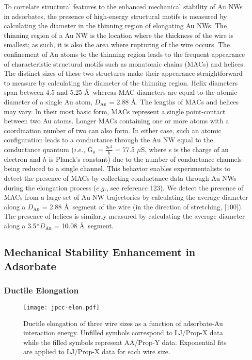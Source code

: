 \documentclass[10pt]{report}  %
\begin{document}
To correlate structural features to the enhanced mechanical stability of Au NWs in adsorbates, the presence of high-energy structural motifs is measured by calculating the diameter in the thinning region of elongating Au NWs.  The thinning region of a Au NW is the location where the thickness of the wire is smallest; as such, it is also the area where rupturing of the wire occurs.  The confinement of Au atoms to the thinning region leads to the frequent appearance of characteristic structural motifs such as monatomic chains (MACs) and helices.  The distinct sizes of these two structures make their appearance straightforward to measure by calculating the diameter of the thinning region.  Helix diameters span between 4.5 and 5.25 \AA\ whereas MAC diameters are equal to the atomic diameter of a single Au atom, $D_\mathrm{Au}$ = 2.88 \AA.  The lengths of MACs and helices may vary.  In their most basic form, MACs represent a single point-contact between two Au atoms.  Longer MACs containing one or more atoms with a coordination number of two can also form.  In either case, such an atomic configuration leads to a conductance through the Au NW equal to the conductance quantum ($i.e.$, G$_o$ =  $\frac{2e^{2}}{h}$ = 77.5 $\mu$S, where $e$ is the charge of an electron and $h$ is Planck's constant) due to the number of conductance channels being reduced to a single channel.\cite{Scheer:1998}  This behavior enables experimentalists to detect the presence of MACs by collecting conductance data through Au NWs during the elongation process ($e.g.$, see reference 123).  We detect the presence of MACs from a large set of Au NW trajectories by calculating the average diameter along a $D_\mathrm{Au}$ = 2.88 \AA\ segment of the wire (in the direction of stretching, [100]). The presence of helices is similarly measured by calculating the average diameter along a 3.5*$D_\mathrm{Au}$ = 10.08 \AA\ segment.

\subsection{Mechanical Stability Enhancement in Adsorbate}

\subsubsection{Ductile Elongation}

%
%
\begin{figure}[b!]
	\centering
	\texttt{[image: jpcc-elon.pdf]}
	\caption{Ductile elongation of three wire sizes as a function of adsorbate-Au interaction energy.  Unfilled symbols correspond to LJ/Prop-X data while the filled symbols represent AA/Prop-Y data.  Exponential fits are applied to LJ/Prop-X data for each wire size. }
	\label{fig:jpcc-elon}
\end{figure}
\end{document}
